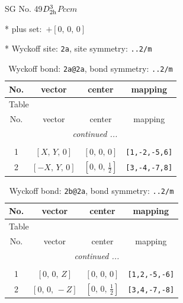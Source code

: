 \documentclass[fleqn,8pt]{jsarticle}
\begin{document}
\setcounter{MaxMatrixCols}{32}

\renewcommand{\tablename}{Table~}
\renewcommand{\figurename}{Figure~}
\begin{center}
\LARGE
SG No. 49\quad$D_{\rm 2h}^{3}$\quad$Pccm$\quad[ orthorhombic ]
\end{center}

* plus set:\,\,\,$+\left[ 0,\, 0,\, 0 \right]$


* Wyckoff site: {\tt 2a}, site symmetry: {\tt ..2/m}
\renewcommand{\arraystretch}{1.2}
\begin{longtable}{cccc}
\caption{Wyckoff bond: {\tt 2a@2a}, bond symmetry: {\tt ..2/m}}
 \\
 \hline \hline
No. & vector & center & mapping \\ \hline \endfirsthead

\multicolumn{3}{l}{\tablename\ \thetable{}} \\
 \hline \hline
No. & vector & center & mapping \\ \hline \endhead

 \hline \hline
\multicolumn{3}{r}{\footnotesize\it continued ...} \\ \endfoot

 \hline \hline
\multicolumn{3}{r}{} \\ \endlastfoot

1 & $\left[ X,\, Y,\, 0 \right]$ & $\left[ 0,\, 0,\, 0 \right]$ & {\tt [1,-2,-5,6]} \\ \hline
2 & $\left[ - X,\, Y,\, 0 \right]$ & $\left[ 0,\, 0,\, \frac{1}{2} \right]$ & {\tt [3,-4,-7,8]} \\
\end{longtable}
\renewcommand{\arraystretch}{1.2}
\begin{longtable}{cccc}
\caption{Wyckoff bond: {\tt 2b@2a}, bond symmetry: {\tt ..2/m}}
 \\
 \hline \hline
No. & vector & center & mapping \\ \hline \endfirsthead

\multicolumn{3}{l}{\tablename\ \thetable{}} \\
 \hline \hline
No. & vector & center & mapping \\ \hline \endhead

 \hline \hline
\multicolumn{3}{r}{\footnotesize\it continued ...} \\ \endfoot

 \hline \hline
\multicolumn{3}{r}{} \\ \endlastfoot

1 & $\left[ 0,\, 0,\, Z \right]$ & $\left[ 0,\, 0,\, 0 \right]$ & {\tt [1,2,-5,-6]} \\ \hline
2 & $\left[ 0,\, 0,\, - Z \right]$ & $\left[ 0,\, 0,\, \frac{1}{2} \right]$ & {\tt [3,4,-7,-8]} \\
\end{longtable}
\end{document}
